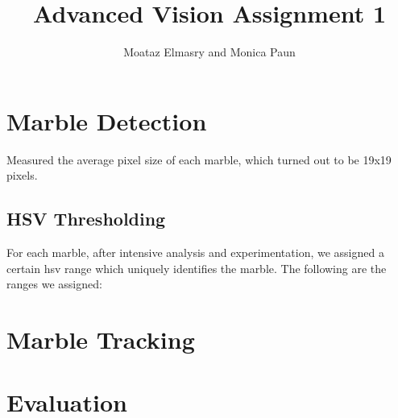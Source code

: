 \documentclass[10pt,a4paper,twocolumn]{report}
\author{Moataz Elmasry and Monica Paun}
\title{Advanced Vision Assignment 1}
\begin{document}
\maketitle

\begin{abstract}

\end{abstract}

\chapter{Marble Detection}

Measured the average pixel size of each marble, which turned out to be 19x19 pixels.

\section{HSV Thresholding}

For each marble, after intensive analysis and experimentation, we assigned a certain hsv range which uniquely identifies the marble. The following are the ranges we assigned:





\chapter{Marble Tracking}

\chapter{Evaluation}
\end{document}
